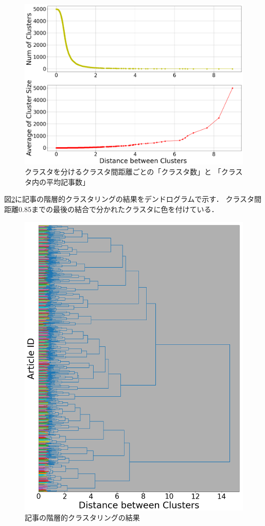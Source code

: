 \documentclass[12pt,a4j]{jreport}
\begin{document}
\begin{figure}[H]
	\centering
	\includegraphics[keepaspectratio, width=120mm]{img/process-06_articles-cluster_threshold-dependencies_reduced-data-to-5000_edit-label_Trim.png}
	\caption{クラスタを分けるクラスタ間距離ごとの「クラスタ数」と
  「クラスタ内の平均記事数」}
	\label{num_and_size_of_clusters_of_articles}
\end{figure}

図\ref{articles_dendrogram}に記事の階層的クラスタリングの結果をデンドログラムで示す．
クラスタ間距離0.85までの最後の結合で分かれたクラスタに色を付けている．

\begin{figure}[H]
	\centering
	\includegraphics[keepaspectratio, width=120mm]{img/process-06_articles-cluster_color_dendrogram_with-threshold-85_reduced-data-to-5000_Trim.png}
	\caption{記事の階層的クラスタリングの結果}
	\label{articles_dendrogram}
\end{figure}
\end{document}
